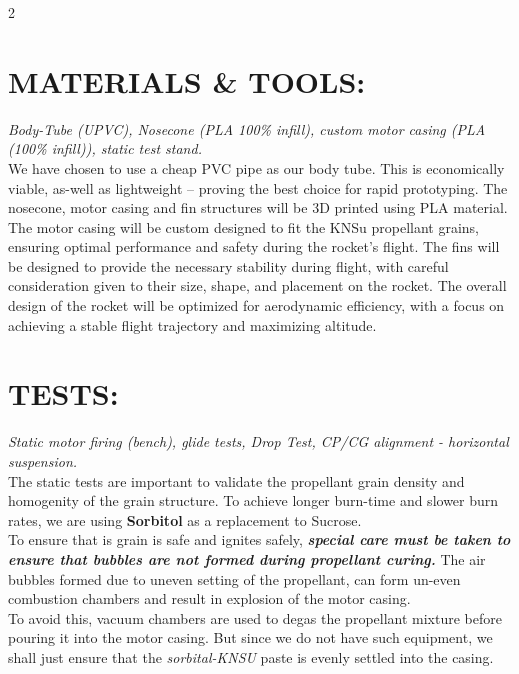 \documentclass[10pt]{report}
\begin{document}
\begin{multicols}{2}
  \section*{ MATERIALS \& TOOLS:} \textit{Body-Tube (UPVC), Nosecone (PLA 100\% infill), custom motor casing (PLA (100\% infill)), static test stand.}\\
  We have chosen to use a cheap PVC pipe as our body tube. This is economically viable, as-well as lightweight -- proving the best choice for rapid prototyping. The nosecone, motor casing and fin structures will be 3D printed using PLA material. The motor casing will be custom designed to fit the KNSu propellant grains, ensuring optimal performance and safety during the rocket's flight. The fins will be designed to provide the necessary stability during flight, with careful consideration given to their size, shape, and placement on the rocket. The overall design of the rocket will be optimized for aerodynamic efficiency, with a focus on achieving a stable flight trajectory and maximizing altitude. \\

  \section*{TESTS:}  \textit{Static motor firing (bench), glide tests, Drop Test, CP/CG alignment - horizontal suspension.} \\
  The static tests are important to validate the propellant grain density and homogenity of the grain structure. To achieve longer burn-time and slower burn rates, we are using \textbf{Sorbitol} as a replacement to Sucrose. \\

  To ensure that is grain is safe and ignites safely, \textbf{\textit{special care must be taken to ensure that bubbles are not formed during propellant curing.}} The air bubbles formed due to uneven setting of the propellant, can form un-even combustion chambers and result in explosion of the motor casing. \\

  To avoid this,  vacuum chambers are used to degas the propellant mixture before pouring it into the motor casing. But since we do not have such equipment, we shall just ensure that the \textit{sorbital-KNSU} paste is evenly settled into the casing. \\


\end{multicols}
\end{document}
